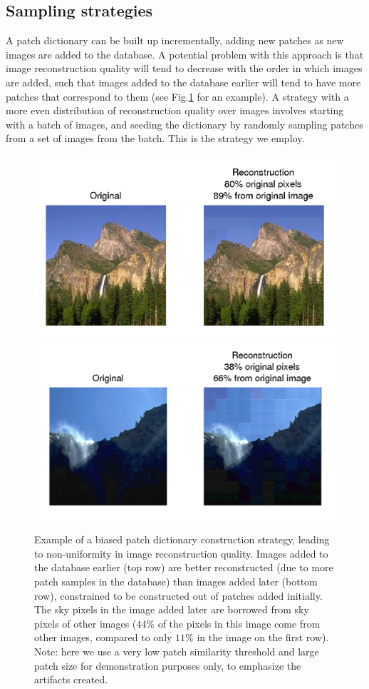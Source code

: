 \subsection{Sampling strategies}
\label{sec:sample}

A patch dictionary can be built up incrementally, adding new patches as new images are added to the database. A potential problem with this approach is that image reconstruction quality will tend to decrease with the order in which images are added, such that images added to the database earlier will tend to have more patches that correspond to them (see Fig.\ref{fig:sampStrategy} for an example). A strategy with a more even distribution of reconstruction quality over images involves starting with a batch of images, and seeding the dictionary by randomly sampling patches from a set of images from the batch. This is the strategy we employ. 

 \begin{figure}
\includegraphics[width=0.9\linewidth]{Figures/009.png}
\includegraphics[width=0.9\linewidth]{Figures/014.png}
\caption{Example of a biased patch dictionary construction strategy, leading to non-uniformity in image reconstruction quality. Images added to the database earlier (top row) are better reconstructed (due to more patch samples in the database) than images added later (bottom row), constrained to be constructed out of patches added initially. The sky pixels in the image added later are borrowed from sky pixels of other images ($44\%$ of the pixels in this image come from other images, compared to only $11\%$ in the image on the first row). Note: here we use a very low patch similarity threshold and large patch size for demonstration purposes only, to emphasize the artifacts created.}
\label{fig:sampStrategy}
\end{figure}


